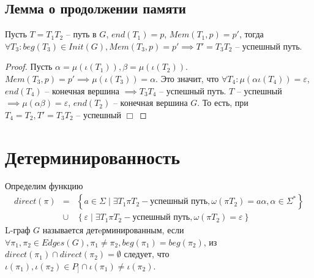 \subsection*{Лемма о продолжении памяти}
\begin{lemma}
    \label{mem_continue_lemma}
    Пусть $T=T_1 T_2$ -- путь в $G$, $end(T_1) = p$, $Mem(T_1, p) = p'$, тогда $\forall T_3 : beg(T_3) \in Init(G), Mem(T_3, p) = p' \implies T' = T_3 T_2$ -- успешный путь. 
\end{lemma}
\begin{proof}
    Пусть $\alpha = \mu(\iota(T_1)), \beta = \mu(\iota(T_2))$.
    $Mem(T_3, p) = p' \implies \mu(\iota(T_3)) = \alpha$.
    Это значит, что $\forall T_4 : \mu(\alpha \iota(T_4)) = \varepsilon$, $end(T_4)$ -- конечная вершина  $\implies T_3 T_4$ -- успешный путь.
    $T$ -- успешный $\implies \mu(\alpha \beta) = \varepsilon$, $end(T_2)$ -- конечная вершина $G$. 
    То есть, при $T_4 = T_2, T' = T_3 T_2$ -- успешный $\Box$ 
\end{proof}

\section{Детерминированность}
Определим функцию \begin{eqnarray*}
    direct(\pi) & = & \left\{ a \in \Sigma \mid \exists T_1 \pi T_2 - \text{успешный путь}, \omega(\pi T_2) = a \alpha, \alpha \in \Sigma^* \right\} \\
    & \cup & \left\{ \varepsilon \mid \exists T_1 \pi T_2 - \text{успешный путь}, \omega(\pi T_2) = \varepsilon \right\}
\end{eqnarray*}
L-граф $G$ называется детeрминированным, если
$\forall \pi_1, \pi_2 \in Edges(G), \pi_1 \neq \pi_2, beg(\pi_1) = beg(\pi_2)$, 
из $direct(\pi_1) \cap direct(\pi_2) = \emptyset$ следует, что 
$\iota(\pi_1), \iota(\pi_2) \in P_] \cap \iota(\pi_1) \neq \iota(\pi_2)$. 

\begin{figure}[h]
    \begin{minipage}[h]{0.49\linewidth}
    \end{minipage}
    \hfill
    \begin{minipage}[h]{0.49\linewidth}
    \end{minipage}
    \label{det_vs_nondet}  
  \end{figure}

